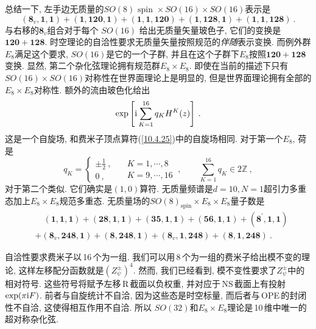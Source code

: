 总结一下, 左手边无质量的$ SO(8)\text{ spin }\times SO(16)\times SO(16)$表示是
\begin{equation}
    (\mathbf{8}_{v},\mathbf{1},\mathbf{1})+(\mathbf{1},\mathbf{120},\mathbf{1})
    +(\mathbf{1},\mathbf{1},\mathbf{120})+(\mathbf{1},\mathbf{128},\mathbf{1})
    +(\mathbf{1},\mathbf{1},\mathbf{128}) \:. \label{11.2.25}
\end{equation}
与右移的$ \mathbf{8}_{v} $组合对于每个 $SO(16)$ 给出无质量矢量玻色子, 它们的变换是$ \mathbf{120}+\mathbf{128}$. 时空理论的自洽性要求无质量矢量按照规范的{\emph{伴随}}表示变换. 而例外群$ E_{8} $满足这个要求, $SO(16) $是它的一个子群, 并且在这个子群下$ E_{8} $按照$ \mathbf{120}+\mathbf{128} $变换. 显然, 第二个杂化弦理论拥有规范群$ E_{8}\times E_{8}$. 即使在当前的描述下只有$ SO(16)\times SO(16) $对称性在世界面理论上是明显的, 但是世界面理论拥有全部的$ E_{8}\times E_{8} $对称性. 额外的流由玻色化给出
\begin{equation}
    \exp \left[ \mathrm{i}\sum_{K=1}^{16}q_{K}H^{K}(z) \right] \:. \label{11.2.26}
\end{equation}
这是一个自旋场, 和费米子顶点算符(\ref{10.4.25})中的自旋场相同. 对于第一个$ E_{8}$, 荷是
\begin{equation}
    q_{K} = \left\{
    \begin{array}{l}
         \pm\tfrac{1}{2} \:,  \\
         0  \:,
    \end{array} \quad
    \begin{array}{l}
         K=1,\cdots,8  \\
         K=9,\cdots, 16 
    \end{array} \:,
    \qquad 
    \sum_{K=1}^{16} q_{K}\in 2\mathds{Z} \:, \label{11.2.27}
    \right.
\end{equation}
对于第二个类似. 它们确实是$ (1,0) $算符. 无质量频谱是$ d=10,N=1 $超引力多重态加上$ E_{8}\times E_{8} $规范多重态. 无质量场的$ SO(8)_{\text{spin}}\times E_{8}\times E_{8} $量子数是
\begin{align}
    &\quad (\mathbf{1},\mathbf{1},\mathbf{1})+(\mathbf{28},\mathbf{1},\mathbf{1})+(\mathbf{35},\mathbf{1},\mathbf{1})
    +(\mathbf{56},\mathbf{1},\mathbf{1})+(\mathbf{8}^{\prime},\mathbf{1},\mathbf{1})  \nonumber \\
    &+(\mathbf{8}_{v},\mathbf{248},\mathbf{1})+(\mathbf{8},\mathbf{248},\mathbf{1})
    +(\mathbf{8}_{v},\mathbf{1},\mathbf{248})+(\mathbf{8},\mathbf{1},\mathbf{248}) \:. \label{11.2.28}
\end{align}

自洽性要求费米子以\,16\,个为一组. 我们可以用\,8\,个为一组的费米子给出模不变的理论, 这样左移配分函数就是$ (Z_{\psi}^{\pm})^{4}$. 然而, 我们已经看到, 模不变性要求了$ Z_{\psi}^{\pm} $中的相对符号. 这些符号将赋予左移\,R\,截面以负权重, 并对应于\,NS\,截面上有投射 $\exp(\pi\mathrm{i} F)$. 前者与自旋统计不自洽, 因为这些态是时空标量, 而后者与\,OPE\,的封闭性不自洽, 这使得相互作用不自洽. 所以 $SO(32) $和$ E_{8}\times E_{8} $理论是\,10\,维中唯一的超对称杂化弦. 

